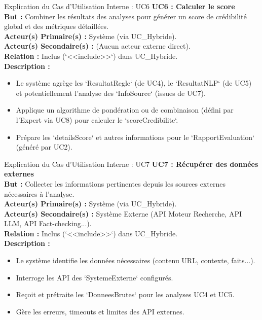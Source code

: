 \documentclass[9pt]{beamer}
\begin{document}
\begin{frame}{Explication du Cas d'Utilisation Interne : UC6}
    \textbf{UC6 : Calculer le score} \\ %
    \textbf{But :} Combiner les résultats des analyses pour générer un score de crédibilité global et des métriques détaillées. \\
    \textbf{Acteur(s) Primaire(s) :} Système (via UC\_Hybride). \\
    \textbf{Acteur(s) Secondaire(s) :} (Aucun acteur externe direct). \\
    \textbf{Relation :} Inclus (`<<include>>`) dans UC\_Hybride. \\
    \textbf{Description :}
    \begin{itemize}
        \item Le système agrège les `ResultatRegle` (de UC4), le `ResultatNLP` (de UC5) et potentiellement l'analyse des `InfoSource` (issues de UC7).
        \item Applique un algorithme de pondération ou de combinaison (défini par l'Expert via UC8) pour calculer le `scoreCredibilite`.
        \item Prépare les `detailsScore` et autres informations pour le `RapportEvaluation` (généré par UC2).
    \end{itemize}
\end{frame}

\begin{frame}{Explication du Cas d'Utilisation Interne : UC7}
    \textbf{UC7 : Récupérer des données externes} \\ %
    \textbf{But :} Collecter les informations pertinentes depuis les sources externes nécessaires à l'analyse. \\
    \textbf{Acteur(s) Primaire(s) :} Système (via UC\_Hybride). \\
    \textbf{Acteur(s) Secondaire(s) :} Système Externe (API Moteur Recherche, API LLM, API Fact-checking...). \\
    \textbf{Relation :} Inclus (`<<include>>`) dans UC\_Hybride. \\
    \textbf{Description :}
    \begin{itemize}
        \item Le système identifie les données nécessaires (contenu URL, contexte, faits...).
        \item Interroge les API des `SystemeExterne` configurés.
        \item Reçoit et prétraite les `DonneesBrutes` pour les analyses UC4 et UC5.
        \item Gère les erreurs, timeouts et limites des API externes.
    \end{itemize}
\end{frame}
\end{document}
